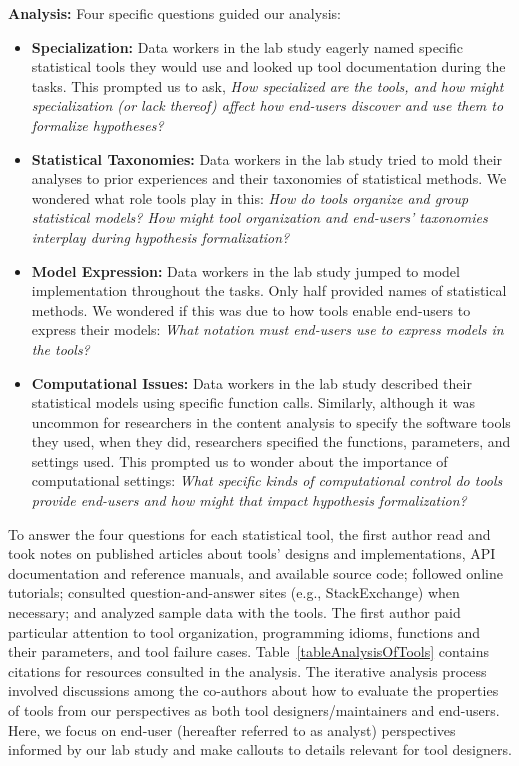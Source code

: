 \noindent\textbf{Analysis:} Four specific questions guided our analysis:
\begin{itemize}
    \item \textbf{Specialization:} Data workers in the lab study eagerly named
    specific statistical tools they would use and looked up tool documentation
    during the tasks. This prompted us to ask, \textit{How specialized are the
    tools, and how might specialization (or lack thereof) affect how end-users
    discover and use them to formalize hypotheses?}
    \item \textbf{Statistical Taxonomies:} Data workers in the lab study tried to
    mold their analyses to prior experiences and their taxonomies of statistical
    methods. We wondered what role tools play in this: \textit{How do tools
    organize and group statistical models? How might tool organization and
    end-users' taxonomies interplay during hypothesis formalization?}
    \item \textbf{Model Expression:} Data workers in the lab study jumped to model
    implementation throughout the tasks. Only half provided names of statistical
    methods. We wondered if this was due to how tools enable end-users to express
    their models: \textit{What notation must end-users use to express models in
    the tools?}
    \item \textbf{Computational Issues:} Data workers in the lab study described
    their statistical models using specific function calls. Similarly, although
    it was uncommon for researchers in the content analysis to specify the
    software tools they used, when they did, researchers specified the
    functions, parameters, and settings used. This prompted us to wonder about
    the importance of computational settings: \textit{What specific kinds of
    computational control do tools provide end-users and how might that impact
    hypothesis formalization?}
\end{itemize}

To answer the four questions for each statistical tool, the first author read
and took notes on published articles about tools' designs and implementations,
API documentation and reference manuals, and available source code; followed
online tutorials; consulted question-and-answer sites (e.g., StackExchange) when
necessary; and analyzed sample data with the tools. The first author paid
particular attention to tool organization, programming idioms, functions and
their parameters, and tool failure cases. Table~\ref{tableAnalysisOfTools}
contains citations for resources consulted in the analysis. The iterative
analysis process involved discussions among the co-authors about how to evaluate
the properties of tools from our perspectives as both tool designers/maintainers
and end-users. Here, we focus on end-user (hereafter referred to as analyst)
perspectives informed by our lab study and make callouts to details relevant for
tool designers.


